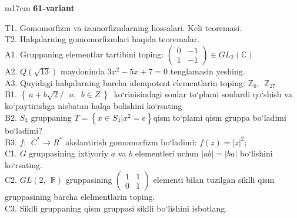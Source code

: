 \documentclass{article}
\begin{document}
\begin{tabular}{m{17cm}}
\textbf{61-variant}
\newline

T1. Gomomorfizm va izomorfizmlarning hossalari. Keli teoremasi. \\
T2. Halqalarning gomomorfizmlari haqida teoremalar. \\
A1. Gruppaning elementlar tartibini toping: \(\begin{pmatrix}
0 & - 1 \\
1 & - 1
\end{pmatrix} \in GL_{2}(\mathbb{C})\) \\
A2. \(Q(\sqrt{13})\) maydoninda \(3x^{2} - 5x + 7 = 0\) tenglamasin yeshing. \\
A3. Quyidagi halqalarning barcha idempotent elementlarin toping: \(\mathbb{Z}_{6},\ \ \mathbb{Z}_{27}\) \\
B1. \(\left\{ \left. \ a + b\sqrt{2}/\ \ \ a,\ \ b \in Z\  \right\} \right.\ \) ko`rinisindagi sonlar to`plami sonlardi qo`shish va ko`paytirishga nisbatan halqa bolishini ko`rsating \\
B2. \(S_{3}\) gruppaning \(T = \left\{ x \in S_{3}|x^{2} = e \right\}\)qism to`plami qism gruppa bo`ladimi bo`ladimi? \\
B3. \(f:\ \ C^{*} \rightarrow R^{*}\) akslantirish gomomorfizm bo`ladimi: \(f(z) = |z|^{2};\) \\
C1. \(G\) gruppasining ixtiyoriy \(a\) va \(b\) elementleri uchun \(|ab| = |ba|\) bo`lishini ko`rsating. \\
C2. \(GL(2,\mathbb{\ \ R})\) gruppasining \(\begin{pmatrix}
1 & 1 \\
0 & 1
\end{pmatrix}\) elementi bilan tuzilgan siklli qism gruppasining barcha elelmentlarin toping. \\
C3. Siklli gruppaning qism gruppasi siklli bo`lishini isbotlang. \\

\end{tabular}
\vspace{1cm}
\end{document}
